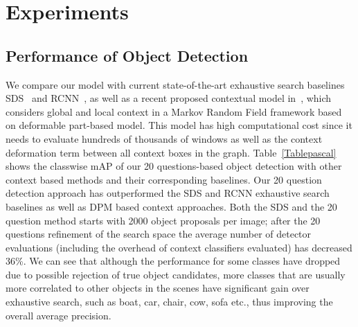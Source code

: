 \section{Experiments}



%

\subsection{Performance of Object Detection} We compare our model with current state-of-the-art exhaustive search baselines SDS~\cite{BharathECCV2014} and RCNN~\cite{girshick14CVPR}, as well as a recent proposed contextual model in~\cite{mottaghi2014role}, which considers global and local context in a Markov Random Field framework based on deformable part-based model. This model has high computational cost since it needs to evaluate hundreds of thousands of windows as well as the context deformation term between all context boxes in the graph. Table~\ref{Tablepascal} shows the classwise mAP of our 20 questions-based object detection with other context based methods and their corresponding baselines.  Our 20 question detection approach has outperformed the SDS and RCNN exhaustive search baselines as well as DPM based context approaches. Both the SDS and the 20 question method starts with 2000 object proposals per image; after the 20 questions refinement of the search space the average number of detector evaluations (including the overhead of context classifiers evaluated) has decreased 36\%. We can see that although the performance for some classes have dropped due to possible rejection of true object candidates, more classes that are usually more correlated  to other objects in the scenes have significant gain over exhaustive search, such as boat, car, chair, cow, sofa etc., thus improving the overall average precision. 

